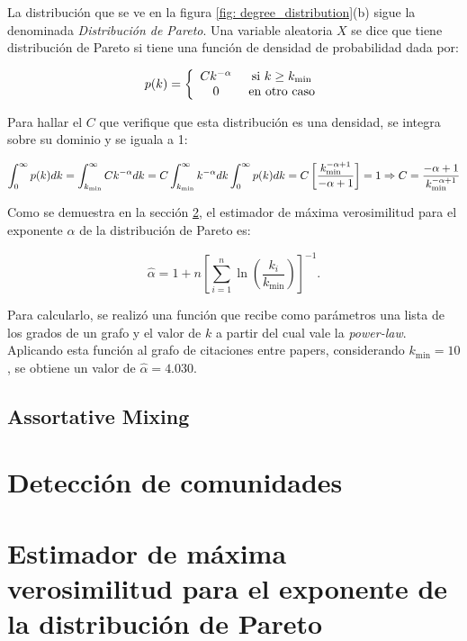 \documentclass{article}
\begin{document}
La distribución que se ve en la figura \ref{fig: degree_distribution}(b) sigue la denominada \textit{Distribución de Pareto}. Una variable aleatoria $X$ se dice que tiene distribución de Pareto si tiene una función de densidad de probabilidad dada por:

$$p(k) = \left\lbrace \begin{array}{c c} C k^{-\alpha} & \text{ si } k\geq k_\text{min} \\ 0 & \text{ en otro caso} \end{array}\right.$$

Para hallar el $C$ que verifique que esta distribución es una densidad, se integra sobre su dominio y se iguala a 1:

$$
    \int_{0}^{\infty} p(k) dk = \int_{k_{\text{min}}}^{\infty} C k^{-\alpha} dk = C \int_{k_{\text{min}}}^{\infty} k^{-\alpha}dk \\
    \int_{0}^{\infty} p(k) dk = C \left[ \frac{k_{\text{min}}^{-\alpha+1}}{-\alpha+1} \right] = 1 \\
    \Rightarrow C = \frac{-\alpha+1}{k_{\text{min}}^{-\alpha+1}}
$$

Como se demuestra en la sección \ref{sec: pareto}, el estimador de máxima verosimilitud para el exponente $\alpha$ de la distribución de Pareto es:

$$
    \hat{\alpha} = 1 + n \left[ \sum_{i=1}^{n} \ln\left(\frac{k_i}{k_{\text{min}}}\right) \right]^{-1}.
$$

Para calcularlo, se realizó una función que recibe como parámetros una lista de los grados de un grafo y el valor de $k$ a partir del cual vale la \textit{power-law}. Aplicando esta función al grafo de citaciones entre papers, considerando $k_{\text{min}} = 10$, se obtiene un valor de $\hat{\alpha} = 4.030$.

\subsection{Assortative Mixing}


\section{Detección de comunidades} \label{sec: comunidades}

\section{Estimador de máxima verosimilitud para el exponente de la distribución de Pareto} \label{sec: pareto}
\end{document}
